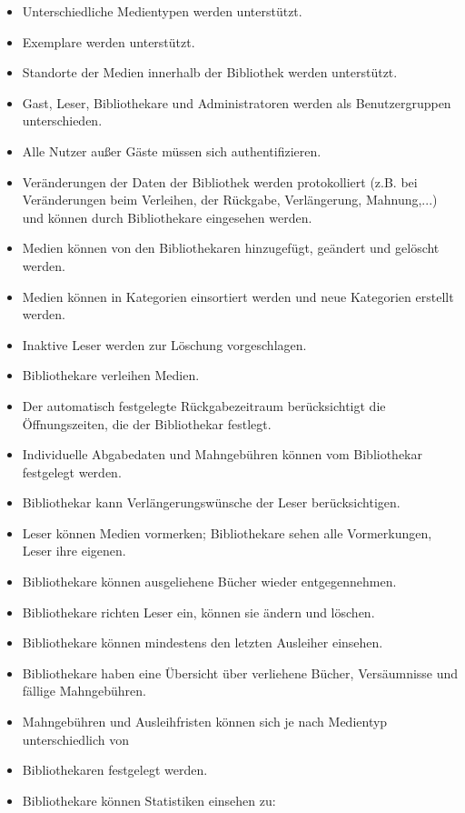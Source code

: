 \documentclass[fontsize=12pt,paper=a4,twoside]{scrartcl}
\begin{document}
\begin{itemize}

\item Unterschiedliche Medientypen werden unterstützt.
\item Exemplare werden unterstützt.
\item Standorte der Medien innerhalb der Bibliothek werden unterstützt.
\item Gast, Leser, Bibliothekare und Administratoren werden als Benutzergruppen unterschieden.
\item Alle Nutzer außer Gäste müssen sich authentifizieren.
\item Veränderungen der Daten der Bibliothek werden protokolliert (z.B. bei Veränderungen beim Verleihen, der Rückgabe, Verlängerung, Mahnung,...) und können durch Bibliothekare eingesehen werden.
\item Medien können von den Bibliothekaren hinzugefügt, geändert und gelöscht werden.
\item Medien können in Kategorien einsortiert werden und neue Kategorien erstellt werden.
\item Inaktive Leser werden zur Löschung vorgeschlagen.
\item Bibliothekare verleihen Medien.
\item Der automatisch festgelegte Rückgabezeitraum berücksichtigt die Öffnungszeiten, die der Bibliothekar festlegt.
\item Individuelle Abgabedaten und Mahngebühren können vom Bibliothekar festgelegt werden.
\item Bibliothekar kann Verlängerungswünsche der Leser berücksichtigen.
\item Leser können Medien vormerken; Bibliothekare sehen alle Vormerkungen, Leser ihre eigenen.
\item Bibliothekare können ausgeliehene Bücher wieder entgegennehmen.
\item Bibliothekare richten Leser ein, können sie ändern und löschen.
\item Bibliothekare können mindestens den letzten Ausleiher einsehen.
\item Bibliothekare haben eine Übersicht über verliehene Bücher, Versäumnisse und fällige Mahngebühren.
\item Mahngebühren und Ausleihfristen können sich je nach Medientyp unterschiedlich von 
\item Bibliothekaren festgelegt werden.
\item Bibliothekare können Statistiken einsehen zu:
\begin{itemize}

\end{itemize}
\end{itemize}
\end{document}
